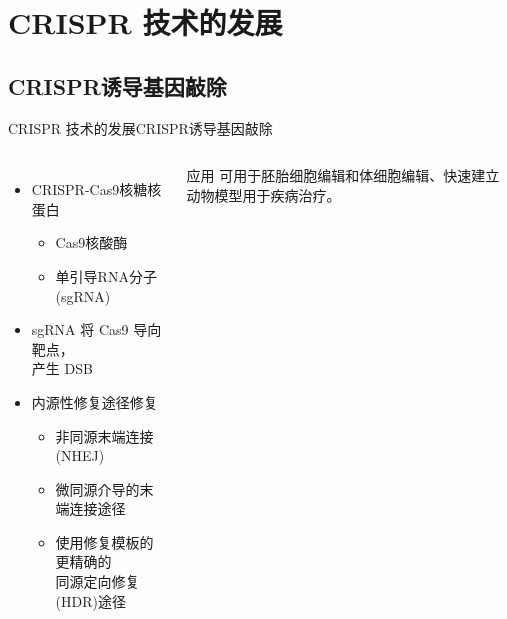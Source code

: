 \documentclass{beamer}
\begin{document}

	\section{CRISPR 技术的发展}

	\subsection{CRISPR诱导基因敲除}
	\begin{frame}{CRISPR 技术的发展}{CRISPR诱导基因敲除}
		\begin{columns}

			\begin{itemize}
				\item CRISPR-Cas9核糖核蛋白
				\begin{itemize}
					\item Cas9核酸酶
					\item 单引导RNA分子(sgRNA)
				\end{itemize}
				\item sgRNA 将 Cas9 导向靶点，\\产生 DSB
				\item 内源性修复途径修复
				\begin{itemize}
					\item 非同源末端连接(NHEJ)
					\item 微同源介导的末端连接途径
					\item 使用修复模板的更精确的\\同源定向修复(HDR)途径
				\end{itemize}
			\end{itemize}

			\begin{alertblock}{应用}
				可用于胚胎细胞编辑和体细胞编辑、快速建立动物模型用于疾病治疗。
			\end{alertblock}


\end{columns}
\end{frame}
\end{document}
